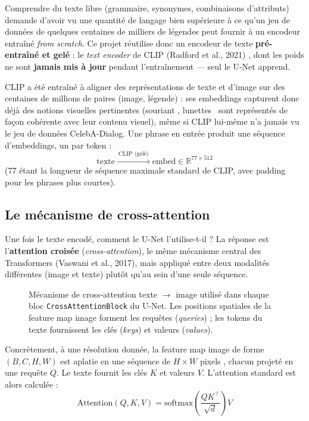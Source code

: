 Comprendre du texte libre (grammaire, synonymes, combinaisons d'attributs) demande d'avoir vu une
quantité de langage bien supérieure à ce qu'un jeu de données de quelques centaines de milliers de
légendes peut fournir à un encodeur entraîné \emph{from scratch}. Ce projet réutilise donc un encodeur
de texte \textbf{pré-entraîné et gelé} : le \emph{text encoder} de CLIP (Radford et al., 2021)
\cite{radford2021clip}, dont les poids ne sont \textbf{jamais mis à jour} pendant l'entraînement —
seul le U-Net apprend.

CLIP a été entraîné à aligner des représentations de texte et d'image sur des centaines de millions de
paires (image, légende) : ses embeddings capturent donc déjà des notions visuelles pertinentes
(\og souriant \fg, \og lunettes \fg\ sont représentés de façon cohérente avec leur contenu visuel),
même si CLIP lui-même n'a jamais vu le jeu de données CelebA-Dialog. Une phrase en entrée produit une
séquence d'embeddings, un par token :
\begin{equation}
    \text{texte} \xrightarrow{\ \text{CLIP (gelé)}\ } \text{embed} \in \mathbb{R}^{77 \times 512}
\end{equation}
(77 étant la longueur de séquence maximale standard de CLIP, avec padding pour les phrases plus courtes).

\subsection{Le mécanisme de cross-attention}

Une fois le texte encodé, comment le U-Net l'utilise-t-il ? La réponse est l'\textbf{attention croisée}
(\emph{cross-attention}), le même mécanisme central des Transformers (Vaswani et al., 2017), mais
appliqué entre deux modalités différentes (image et texte) plutôt qu'au sein d'une seule séquence.

\begin{figure}[h]
\centering
\resizebox{0.85\textwidth}{!}{}
\caption{Mécanisme de cross-attention texte $\to$ image utilisé dans chaque bloc \texttt{CrossAttentionBlock}
du U-Net. Les positions spatiales de la feature map image forment les requêtes (\emph{queries}) ; les
tokens du texte fournissent les clés (\emph{keys}) et valeurs (\emph{values}).}
\label{fig:cross-attention}
\end{figure}

Concrètement, à une résolution donnée, la feature map image de forme $(B, C, H, W)$ est aplatie en une
séquence de $H \times W$ \og pixels \fg, chacun projeté en une requête $Q$. Le texte fournit les clés
$K$ et valeurs $V$. L'attention standard est alors calculée :
\begin{equation}
    \text{Attention}(Q, K, V) = \text{softmax}\!\left(\frac{QK^\top}{\sqrt{d}}\right) V
\end{equation}

